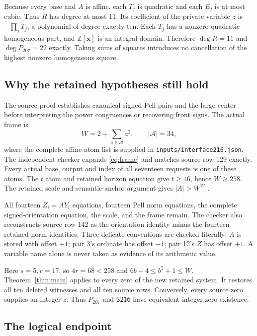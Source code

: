 \documentclass[10pt,letterpaper]{article}
\theoremstyle{remark}\newtheorem{remark}[theorem]{Remark}
\newcommand{\Z}{\mathbb Z}\newcommand{\Q}{\mathbb Q}\newcommand{\N}{\mathbb N}
\newcommand{\src}{\textsf{S216}}
\begin{document}
Because every base and $A$ is affine, each $T_j$ is quadratic and each
$E_j$ is at most cubic. Thus $R$ has degree at most 11. Its coefficient
of the private variable $z$ is $-\prod_jT_j$, a polynomial of degree
exactly ten. Each $T_j$ has a nonzero quadratic homogeneous part, and
$\Z[\mathbf x]$ is an integral domain. Therefore $\deg R=11$ and
$\deg P_{207}=22$ exactly. Taking sums of squares introduces no
cancellation of the highest nonzero homogeneous square.

\subsection{Why the retained hypotheses still hold}

The source proof establishes canonical signed Pell pairs and the large
center before interpreting the power congruences or recovering front
signs. The actual frame is
\begin{equation}
 W=2+\sum_{a\in\mathcal A}a^2,\qquad |\mathcal A|=34,
 \label{eq:frame}
\end{equation}
where the complete affine-atom list is supplied in
\texttt{inputs/interface216.json}. The independent checker expands
\eqref{eq:frame} and matches source row 129 exactly. Every actual base,
output and index of all seventeen requests is one of these atoms.
The $t$ atom and retained horizon equation give $t\ge16$, hence
$W\ge258$. The retained scale and semantic-anchor argument gives
$|A|>W^W$ \cite{source172}.

All fourteen $Z_i=AY_i$ equations, fourteen Pell norm equations, the
complete signed-orientation equation, the scale, and the frame remain.
The checker also reconstructs source row 142 as the orientation identity
minus the fourteen retained norm identities. Three delicate conventions
are checked literally: $A$ is stored with offset $+1$; pair 3's ordinate
has offset $-1$; pair 12's $Z$ has offset $+1$. A variable name alone
is never taken as evidence of its arithmetic value.

Here $s=5,r=17$, so $4r=68<258$ and
$6b+4\le b^2+1\le W$. Theorem~\ref{thm:main} applies to every zero
of the new retained system. It restores all ten deleted witnesses and
all ten source rows. Conversely, every source zero supplies an integer
$z$. Thus $P_{207}$ and $\src$ have equivalent integer-zero existence.

\subsection{The logical endpoint}
\end{document}
